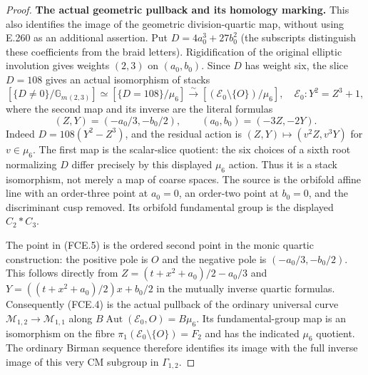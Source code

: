 \begin{proof}
\par\medskip\noindent\textbf{The actual geometric pullback and its homology marking.}\quad
This also identifies the image of the geometric division-quartic
map, without using E.260 as an additional assertion.  Put
$D=4a_0^3+27b_0^2$ (the subscripts distinguish these coefficients
from the braid letters).  Rigidification of the original elliptic
involution gives weights $(2,3)$ on $(a_0,b_0)$.  Since $D$ has
weight six, the slice $D=108$ gives an actual isomorphism of stacks
\[
 [\{D\ne0\}/\mathbb G_m{}_{(2,3)}]
   \simeq[\{D=108\}/\mu_6]
   \xrightarrow{\ \sim\ }
 [ (\mathcal E_0\setminus\{O\})/\mu_6],
 \quad \mathcal E_0:Y^2=Z^3+1,                         \tag{FCE.4}
\]
where the second map and its inverse are the literal formulas
\[
 (Z,Y)=(-a_0/3,-b_0/2),\qquad (a_0,b_0)=(-3Z,-2Y).
                                                               \tag{FCE.5}
\]
Indeed $D=108(Y^2-Z^3)$, and the residual action is
$(Z,Y)\mapsto(v^2Z,v^3Y)$ for $v\in\mu_6$.
The first map is the scalar-slice quotient: the six choices of a
sixth root normalizing $D$ differ precisely by this displayed
$\mu_6$ action.  Thus it is a stack isomorphism, not merely a map
of coarse spaces.  The source is the orbifold affine line with
an order-three point at $a_0=0$, an order-two point at $b_0=0$,
and the discriminant cusp removed.  Its orbifold fundamental
group is the displayed $C_2*C_3$.

The point in (FCE.5) is the ordered second point in the monic
quartic construction: the positive pole is $O$ and the negative
pole is $(-a_0/3,-b_0/2)$.  This follows directly from
$Z=(t+x^2+a_0)/2-a_0/3$ and
$Y=((t+x^2+a_0)/2)x+b_0/2$ in the mutually inverse quartic formulas.
Consequently (FCE.4) is the actual pullback of the ordinary
universal curve $\mathcal M_{1,2}\to\mathcal M_{1,1}$ along
$B\operatorname{Aut}(\mathcal E_0,O)=B\mu_6$.
Its fundamental-group map is an isomorphism on the fibre
$\pi_1(\mathcal E_0\setminus\{O\})=F_2$ and has the indicated
$\mu_6$ quotient.  The ordinary Birman sequence therefore
identifies its image with the full inverse image of this very
CM subgroup in $\Gamma_{1,2}$.


\end{proof}
